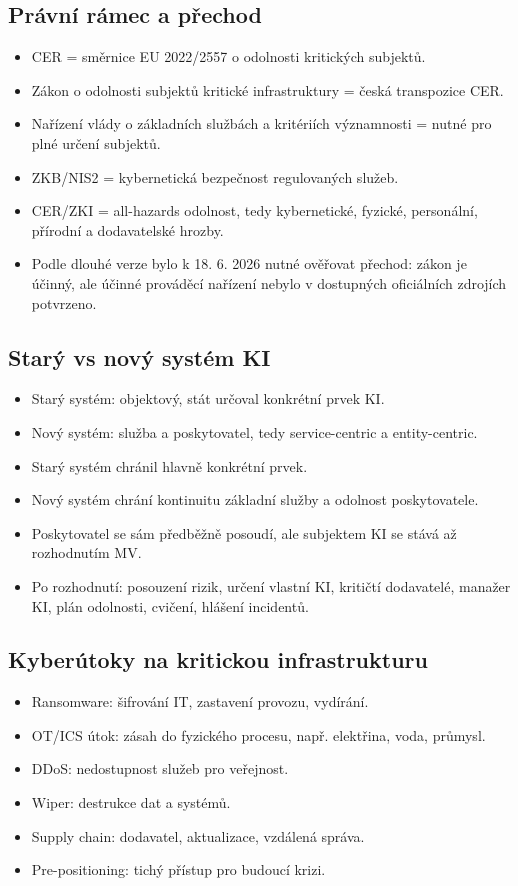 \documentclass[10pt,a4paper]{article}
\newcommand{\blok}[1]{\subsection*{#1}}
\begin{document}
\blok{Právní rámec a přechod}
\begin{itemize}
  \item CER = směrnice EU 2022/2557 o odolnosti kritických subjektů.
  \item Zákon o odolnosti subjektů kritické infrastruktury = česká transpozice CER.
  \item Nařízení vlády o základních službách a kritériích významnosti = nutné pro plné určení subjektů.
  \item ZKB/NIS2 = kybernetická bezpečnost regulovaných služeb.
  \item CER/ZKI = all-hazards odolnost, tedy kybernetické, fyzické, personální, přírodní a dodavatelské hrozby.
  \item Podle dlouhé verze bylo k 18. 6. 2026 nutné ověřovat přechod: zákon je účinný, ale účinné prováděcí nařízení nebylo v dostupných oficiálních zdrojích potvrzeno.
\end{itemize}

\blok{Starý vs nový systém KI}
\begin{itemize}
  \item Starý systém: objektový, stát určoval konkrétní prvek KI.
  \item Nový systém: služba a poskytovatel, tedy service-centric a entity-centric.
  \item Starý systém chránil hlavně konkrétní prvek.
  \item Nový systém chrání kontinuitu základní služby a odolnost poskytovatele.
  \item Poskytovatel se sám předběžně posoudí, ale subjektem KI se stává až rozhodnutím MV.
  \item Po rozhodnutí: posouzení rizik, určení vlastní KI, kritičtí dodavatelé, manažer KI, plán odolnosti, cvičení, hlášení incidentů.
\end{itemize}

\blok{Kyberútoky na kritickou infrastrukturu}
\begin{itemize}
  \item Ransomware: šifrování IT, zastavení provozu, vydírání.
  \item OT/ICS útok: zásah do fyzického procesu, např. elektřina, voda, průmysl.
  \item DDoS: nedostupnost služeb pro veřejnost.
  \item Wiper: destrukce dat a systémů.
  \item Supply chain: dodavatel, aktualizace, vzdálená správa.
  \item Pre-positioning: tichý přístup pro budoucí krizi.
\end{itemize}
\end{document}
